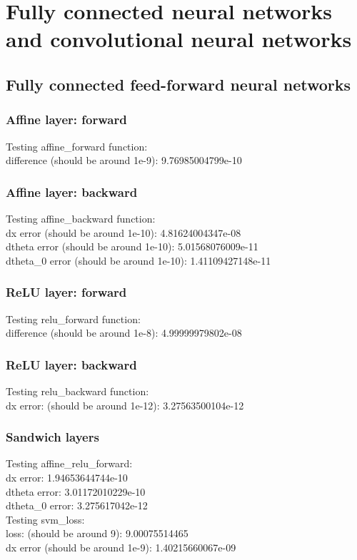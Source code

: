 \documentclass{article}
\begin{document}
\newpage

\section{Fully connected neural networks and convolutional neural networks}

\subsection{Fully connected feed-forward neural networks}

\subsubsection{Affine layer: forward}
{\footnotesize 
Testing affine\_forward function:\\
difference (should be around 1e-9):  9.76985004799e-10\\
}


\subsubsection{Affine layer: backward}
{\footnotesize
Testing affine\_backward function:\\
dx error (should be around 1e-10):  4.81624004347e-08\\
dtheta error (should be around 1e-10):  5.01568076009e-11\\
dtheta\_0 error (should be around 1e-10):  1.41109427148e-11\\
}

\subsubsection{ReLU layer: forward}
{\footnotesize
Testing relu\_forward function:\\
difference (should be around 1e-8):  4.99999979802e-08\\
}

\subsubsection{ReLU layer: backward}
{\footnotesize
Testing relu\_backward function:\\
dx error: (should be around 1e-12):  3.27563500104e-12\\
}


\subsubsection*{Sandwich layers}
{\footnotesize
Testing affine\_relu\_forward:\\
dx error:  1.94653644744e-10\\
dtheta error:  3.01172010229e-10\\
dtheta\_0 error:  3.275617042e-12\\

\noindent Testing svm\_loss:\\
loss: (should be around 9):  9.00075514465\\
dx error (should be around 1e-9):  1.40215660067e-09\\
}
\end{document}

